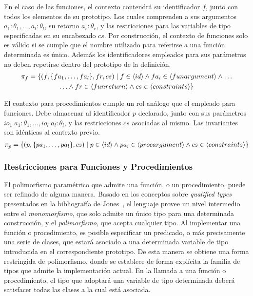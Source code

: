 En el caso de las funciones, el contexto contendrá su identificador $f$, junto con todos los elementos de su prototipo.
Los cuales comprenden a sus argumentos $a_1: \theta_1, \ldots, a_l: \theta_l$, su retorno $a_r: \theta_r$, y las restricciones para las variables de tipo especificadas en su encabezado $cs$.
Por construcción, el contexto de funciones solo es válido si se cumple que el nombre utilizado para referirse a una función determinada es único.
Además los identificadores empleados para sus parámetros no deben repetirse dentro del prototipo de la definición.
\begin{multline*}
\pi_{f} =
\{
(f, \{ fa_1, \ldots, fa_l \}, fr, cs) \mid
f \in \langle id \rangle
\wedge
fa_i \in \langle funargument \rangle
\wedge
\ldots
\\
\ldots
\wedge
fr \in \langle funreturn \rangle
\wedge
cs \in \langle constraints \rangle
\}
\end{multline*}

El contexto para procedimientos cumple un rol análogo que el empleado para funciones.
Debe almacenar al identificador $p$ declarado, junto con sus parámetros $io_1 \; a_1: \theta_1, \ldots, io_l \; a_l: \theta_l$, y las restricciones $cs$ asociadas al mismo.
Las invariantes son idénticas al contexto previo.
\begin{multline*}
\pi_{p} =
\{
(p, \{ pa_1, \ldots, pa_l \}, cs) \mid
p \in \langle id \rangle
\wedge
pa_i \in \langle procargument \rangle
\wedge
cs \in \langle constraints \rangle
\}
\end{multline*}

\iffalse
\subsubsection{Restricciones para Funciones y Procedimientos}

El polimorfismo paramétrico que admite una función, o un procedimiento, puede ser refinado de alguna manera.
Basado en los conceptos sobre \textit{qualified types} presentados en la bibliografía de Jones~\cite{Jones}, el lenguaje provee un nivel intermedio entre el \textit{monomorfismo}, que solo admite un único tipo para una determinada construcción, y el \textit{polimorfismo}, que acepta cualquier tipo.
Al implementar una función o procedimiento, es posible especificar un predicado, o más precisamente una serie de clases, que estará asociado a una determinada variable de tipo introducida en el correspondiente prototipo.
De esta manera se obtiene una forma restringida de polimorfismo, donde se establece de forma explícita la familia de tipos que admite la implementación actual.
En la llamada a una función o procedimiento, el tipo que adoptará una variable de tipo determinada deberá satisfacer todas las clases a la cual está asociada.

